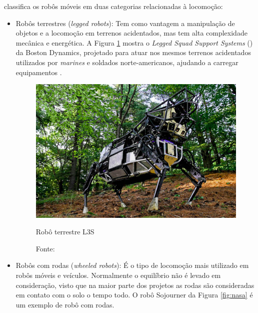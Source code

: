  classifica os robôs móveis em duas categorias relacionadas à locomoção: 
\begin{itemize}
 
 \item Robôs terrestres (\textit{legged robots}): Tem como vantagem a manipulação de objetos e a locomoção em terrenos 
acidentados, mas tem alta complexidade mecânica e energética. A Figura \ref{fig:boston} mostra o 
\textit{Legged Squad Support Systems} () da Boston Dynamics, 
projetado para atuar nos mesmos terrenos acidentados utilizados por \textit{marines} e soldados norte-americanos, 
ajudando a carregar equipamentos \cite{bostondyn}. 
\begin{figure}[h]
 \centering
 \captionsetup{width=0.44\textwidth,font=footnotesize,textfont=bf}
 \includegraphics[scale=0.4]{figuras/bostondyn.png}
 \caption{Robô terrestre  L3S\label{fig:boston}}
 \vspace{-0.3cm}
 \caption*{Fonte: \cite{bostondyn}}
\end{figure}


\item Robôs com rodas (\textit{wheeled robots}): É o tipo de locomoção mais utilizado em robôs móveis e veículos. Normalmente o 
equilíbrio não é levado em consideração, visto que na maior parte dos projetos as rodas são consideradas em contato com o solo 
o tempo todo. O robô Sojourner da Figura \ref{fig:nasa} é um exemplo de robô com rodas.%
\end{itemize}


